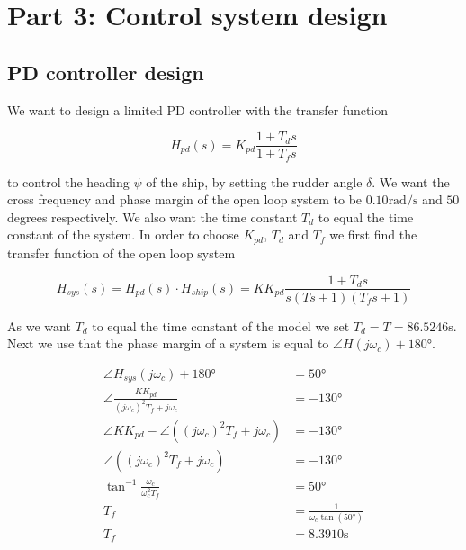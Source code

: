 
\section{Part 3: Control system design}

\subsection{PD controller design}

We want to design a limited PD controller with the transfer function

\begin{equation}
    H_{pd}(s) = K_{pd}\frac{1+T_ds}{1+T_fs} \label{eq:H_pd}
\end{equation}

to control the heading $\psi$ of the ship, by setting the rudder angle $\delta$. We want the cross frequency and phase margin of the open loop system to be $0.10\si{\radian\per\second}$ and $50$ degrees respectively. We also want the time constant $T_d$ to equal the time constant of the system. In order to choose $K_{pd}$, $T_d$ and $T_f$ we first find the transfer function of the open loop system

\begin{equation}
    H_{sys}(s) = H_{pd}(s) \cdot H_{ship}(s) = KK_{pd}\frac{1+T_ds}{s(Ts+1)(T_fs+1)} \label{eq:H_sys}
\end{equation}

As we want $T_d$ to equal the time constant of the model we set $T_d = T = 86.5246 \si{\second}$. Next we use that the phase margin of a system is equal to $\angle H(j\omega_c) + 180 \si{\degree}$.

\begin{subequations}
    \begin{align}
        \angle H_{sys}(j\omega_c) + 180 \si{\degree} &= 50 \si{\degree} \\
        \angle \frac{KK_{pd}}{(j\omega_c)^2T_f+j\omega_c} &= -130 \si{\degree}\\
        \angle KK_{pd} - \angle ((j\omega_c)^2T_f+j\omega_c) &= -130 \si{\degree} \\
        \angle ((j\omega_c)^2T_f+j\omega_c) &= -130\si{\degree} \\
        \tan^{-1}\frac{\omega_c}{\omega_c^2T_f} &= 50 \si{\degree} \\
        T_f &= \frac{1}{ \omega_c \tan (50 \si{\degree}) } \\
        T_f &= 8.3910 \si{\second} \label{eq:T_f}
    \end{align}
\end{subequations}

